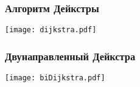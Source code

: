 \documentclass{beamer}
\begin{document}



\begin{frame}
\frametitle{Алгоритм Дейкстры}
\texttt{[image: dijkstra.pdf]}
\end{frame}


\begin{frame}
\frametitle{Двунаправленный Дейкстра}
\texttt{[image: biDijkstra.pdf]}
\end{frame}


\end{document}
